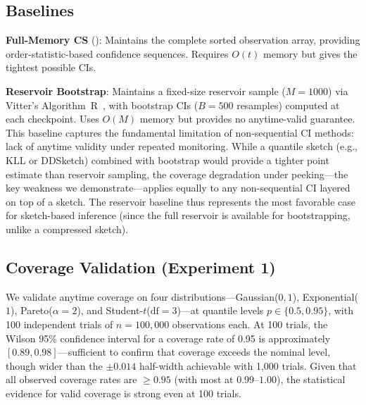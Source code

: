 \documentclass{article}
\begin{document}
\subsection{Baselines}

\textbf{Full-Memory CS} (\citealt{howard2022sequential}): Maintains the complete sorted observation array, providing order-statistic-based confidence sequences. Requires $O(t)$ memory but gives the tightest possible CIs.

\textbf{Reservoir Bootstrap}: Maintains a fixed-size reservoir sample ($M = 1000$) via Vitter's Algorithm~R~\citep{vitter1985random}, with bootstrap CIs ($B = 500$ resamples) computed at each checkpoint. Uses $O(M)$ memory but provides no anytime-valid guarantee. This baseline captures the fundamental limitation of non-sequential CI methods: lack of anytime validity under repeated monitoring. While a quantile sketch (e.g., KLL or DDSketch) combined with bootstrap would provide a tighter point estimate than reservoir sampling, the coverage degradation under peeking---the key weakness we demonstrate---applies equally to any non-sequential CI layered on top of a sketch. The reservoir baseline thus represents the most favorable case for sketch-based inference (since the full reservoir is available for bootstrapping, unlike a compressed sketch).

\subsection{Coverage Validation (Experiment 1)}

We validate anytime coverage on four distributions---Gaussian($0, 1$), Exponential($1$), Pareto($\alpha\!=\!2$), and Student-$t$($\text{df}\!=\!3$)---at quantile levels $p \in \{0.5, 0.95\}$, with 100 independent trials of $n = 100{,}000$ observations each. At 100 trials, the Wilson 95\% confidence interval for a coverage rate of 0.95 is approximately $[0.89, 0.98]$---sufficient to confirm that coverage exceeds the nominal level, though wider than the $\pm 0.014$ half-width achievable with 1{,}000 trials. Given that all observed coverage rates are $\geq 0.95$ (with most at $0.99$--$1.00$), the statistical evidence for valid coverage is strong even at 100 trials.
\end{document}
